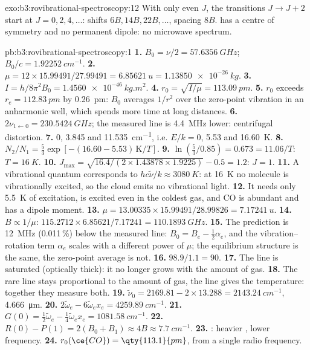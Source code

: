 \begin{solution}{exo:b3:rovibrational-spectroscopy:12}
With only even $J$, the transitions $J \to J + 2$ start at $J = 0, 2, 4, \dots$: shifts
$6B, 14B, 22B, \dots$, spacing $8B$.  has a centre of symmetry and no
permanent dipole: no microwave spectrum.
\end{solution}

\begin{solution}{pb:b3:rovibrational-spectroscopy:1}
\textbf{1.} $B_0 = \nu/2 = \qty{57.6356}{GHz}$; $B_0/c = \qty{1.92252}{cm^{-1}}$.
\textbf{2.} $\mu = 12 \times 15.99491/27.99491 = \qty{6.85621}{u} = \qty{1.13850e-26}{kg}$.
\textbf{3.} $I = h/8\pi^2B_0 = \qty{1.4560e-46}{kg.m^2}$.
\textbf{4.} $r_0 = \sqrt{I/\mu} = \qty{113.09}{pm}$.
\textbf{5.} $r_0$ exceeds $r_e = \qty{112.83}{pm}$ by \qty{0.26}{pm}: $B_0$ averages $1/r^2$
over the zero-point vibration in an anharmonic well, which spends more time
at long distances.
\textbf{6.} $2\nu_{1\leftarrow0} = \qty{230.5424}{GHz}$; the measured line is \qty{4.4}{MHz} lower:
centrifugal distortion.
\textbf{7.} $0$, 3.845 and \qty{11.535}{cm^{-1}}, i.e. $E/k = 0$, 5.53 and \qty{16.60}{K}.
\textbf{8.} $N_2/N_1 = \frac53\exp[-(16.60 - 5.53)\,\mathrm K/T]$.
\textbf{9.} $\ln(\frac53/0.85) = 0.673 = 11.06/T$: $T = \qty{16}{K}$.
\textbf{10.} $J_{\max} = \sqrt{16.4/(2 \times 1.43878 \times 1.9225)} - 0.5 = 1.2$: $J = 1$.
\textbf{11.} A vibrational quantum corresponds to $hc\tilde\nu/k \approx \qty{3080}{K}$: at
\qty{16}{K} no molecule is vibrationally excited, so the cloud emits no vibrational
light.
\textbf{12.} It needs only \qty{5.5}{K} of excitation, is excited even in the coldest
gas, and CO is abundant and has a dipole moment.
\textbf{13.} $\mu = 13.00335 \times 15.99491/28.99826 = \qty{7.17241}{u}$.
\textbf{14.} $B \propto 1/\mu$: $115.2712 \times 6.85621/7.17241 = \qty{110.1893}{GHz}$.
\textbf{15.} The prediction is \qty{12}{MHz} (0.011\,\%) below the measured line: $B_0 = B_e - \frac12\alpha_e$, and the
vibration--rotation term $\alpha_e$ scales with a different power of $\mu$; the
equilibrium structure is the same, the zero-point average is not.
\textbf{16.} $98.9/1.1 = 90$.
\textbf{17.} The  line is saturated (optically thick): it no longer
grows with the amount of gas.
\textbf{18.} The rare  line stays proportional to the amount of gas, the
 line gives the temperature: together they measure both.
\textbf{19.} $\tilde\nu_0 = 2169.81 - 2 \times 13.288 = \qty{2143.24}{cm^{-1}}$, \qty{4.666}{\micro m}.
\textbf{20.} $2\tilde\omega_e - 6\tilde\omega_ex_e = \qty{4259.89}{cm^{-1}}$.
\textbf{21.} $G(0) = \frac12\tilde\omega_e - \frac14\tilde\omega_ex_e = \qty{1081.58}{cm^{-1}}$.
\textbf{22.} $R(0) - P(1) = 2(B_0 + B_1) \approx 4B \approx \qty{7.7}{cm^{-1}}$.
\textbf{23.} : heavier , lower frequency.
\textbf{24.} \textbf{$r_0(\ce{CO}) = \qty{113.1}{pm}$}, from a single radio frequency.
\end{solution}
